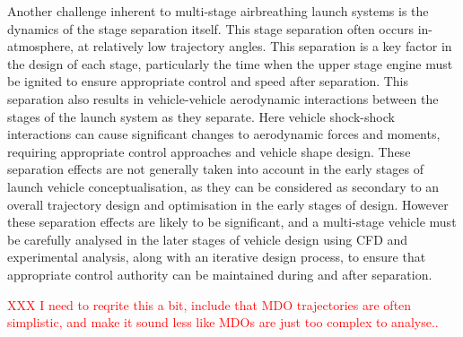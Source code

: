 Another challenge inherent to multi-stage airbreathing launch systems is the dynamics of the stage separation itself. This stage separation often occurs in-atmosphere, at relatively low trajectory angles. This separation is a key factor in the design of each stage, particularly the time when the upper stage engine must be ignited to ensure appropriate control and speed after separation. This separation also results in vehicle-vehicle aerodynamic interactions between the stages of the launch system as they separate. Here vehicle shock-shock interactions can cause significant changes to aerodynamic forces and moments, requiring appropriate control approaches and vehicle shape design\cite{mochammad,Kudo2005}. 
These separation effects are not generally taken into account in the early stages of launch vehicle conceptualisation, as they can be considered as secondary to an overall trajectory design and optimisation in the early stages of design.  %
However these separation effects are likely to be significant, and a multi-stage vehicle must be carefully analysed in the later stages of vehicle design using CFD and experimental analysis, along with an iterative design process, to ensure that appropriate control authority can be maintained during and after separation\cite{mochammad}. 

\textcolor{red}{XXX I need to reqrite this a bit, include that MDO trajectories are often simplistic, and make it sound less like MDOs are just too complex to analyse..}

